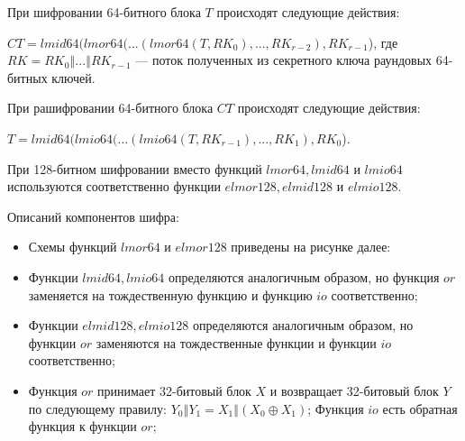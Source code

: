 \documentclass{./civarticle}
\begin{document}
При шифровании 64-битного блока $T$ происходят следующие действия:

$CT = lmid64(lmor64(...(lmor64(T, RK_0), ..., RK_{r-2}), RK_{r-1}$), где $RK = RK_0 \mathbin\Vert ... \mathbin\Vert RK_{r-1}$ --- поток полученных из секретного ключа раундовых 64-битных ключей.

При рашифровании 64-битного блока $CT$ происходят следующие действия:

$T = lmid64(lmio64(...(lmio64(T, RK_{r-1}), ..., RK_{1}), RK_{0}$).

При 128-битном шифровании вместо функций $lmor64, lmid64$ и $lmio64$ используются соответственно функции $elmor128, elmid128$  и $elmio128$.

Описаний компонентов шифра:

\begin{itemize}
    \item Схемы функций $lmor64$ и $elmor128$ приведены на рисунке далее:
    
    \begin{figure}[h!]
    \end{figure}

    \item Функции $lmid64, lmio64$ определяются аналогичным образом, но функция $or$ заменяется на тождественную функцию и функцию $io$ соответственно;

    \item Функции $elmid128, elmio128$ определяются аналогичным образом, но функции $or$ заменяются на тождественные функции и функции $io$ соответственно;

    \item Функция $or$ принимает 32-битовый блок $X$ и возвращает 32-битовый блок $Y$ по следующему правилу: $Y_0 \mathbin\Vert Y_1 = X_1 \mathbin\Vert (X_0 \oplus X_1)$; Функция $io$ есть обратная функция к функции $or$;


\end{itemize}
\end{document}
